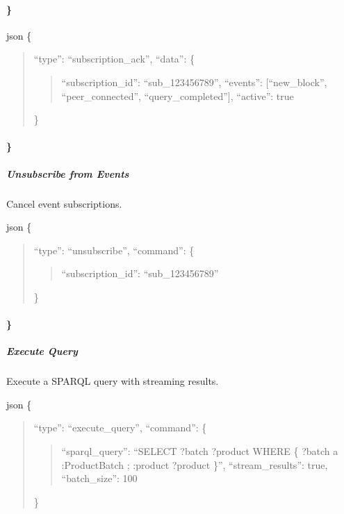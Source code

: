 \documentclass[letterpaper,10pt,english]{sphinxmanual}
\begin{document}
\paragraph{\}}
\label{\detokenize{api/websocket-api:id60}}
\sphinxAtStartPar
{}
{\color{red}\bfseries{}\textasciigrave{}\textasciigrave{}}{\color{red}\bfseries{}\textasciigrave{}}json
\{
\begin{quote}

\sphinxAtStartPar
“type”: “subscription\_ack”,
“data”: \{
\begin{quote}

\sphinxAtStartPar
“subscription\_id”: “sub\_123456789”,
“events”: {[}“new\_block”, “peer\_connected”, “query\_completed”{]},
“active”: true
\end{quote}

\sphinxAtStartPar
\}
\end{quote}


\paragraph{\}}
\label{\detokenize{api/websocket-api:id65}}

\subparagraph{Unsubscribe from Events}
\label{\detokenize{api/websocket-api:unsubscribe-from-events}}
\sphinxAtStartPar
Cancel event subscriptions.

\sphinxAtStartPar
{}
{\color{red}\bfseries{}\textasciigrave{}\textasciigrave{}}{\color{red}\bfseries{}\textasciigrave{}}json
\{
\begin{quote}

\sphinxAtStartPar
“type”: “unsubscribe”,
“command”: \{
\begin{quote}

\sphinxAtStartPar
“subscription\_id”: “sub\_123456789”
\end{quote}

\sphinxAtStartPar
\}
\end{quote}


\paragraph{\}}
\label{\detokenize{api/websocket-api:id70}}

\subparagraph{Execute Query}
\label{\detokenize{api/websocket-api:execute-query}}
\sphinxAtStartPar
Execute a SPARQL query with streaming results.

\sphinxAtStartPar
{}
{\color{red}\bfseries{}\textasciigrave{}\textasciigrave{}}{\color{red}\bfseries{}\textasciigrave{}}json
\{
\begin{quote}

\sphinxAtStartPar
“type”: “execute\_query”,
“command”: \{
\begin{quote}

\sphinxAtStartPar
“sparql\_query”: “SELECT ?batch ?product WHERE \{ ?batch a :ProductBatch ; :product ?product \}”,
“stream\_results”: true,
“batch\_size”: 100
\end{quote}

\sphinxAtStartPar
\}
\end{quote}
\end{document}
